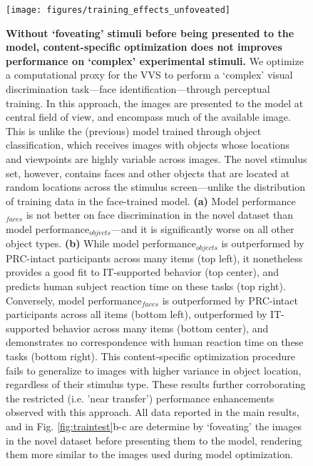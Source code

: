 \documentclass[11pt]{article}
\begin{document}
\begin{figure}[ht]
\centering
\texttt{[image: figures/training\_effects\_unfoveated]}
\renewcommand{\figurename}{Supplementary Figure}
\caption{\textbf{ Without `foveating' stimuli before being presented to the model, content-specific optimization does not improves performance on `complex' experimental stimuli.} We optimize a computational proxy for the VVS to perform a ‘complex’ visual discrimination task---face identification---through perceptual training. In this approach, the images are presented to the model at central field of view, and encompass much of the available image. This is unlike the (previous) model trained through object classification, which receives images with objects whose locations and viewpoints are highly variable across images. The novel stimulus set, however, contains faces and other objects that are located at random locations across the stimulus screen---unlike the distribution of training data in the face-trained model. \textbf{(a)} Model performance$_{faces}$ is not better on face discrimination in the novel dataset than model performance$_{objects}$---and it is significantly worse on all other object types. \textbf{(b)} While model performance$_{objects}$ is outperformed by PRC-intact participants across many items (top left), it nonetheless provides a good fit to IT-supported behavior (top center), and predicts human subject reaction time on these tasks (top right). Conversely, model performance$_{faces}$ is outperformed by PRC-intact participants across all items (bottom left), outperformed by IT-supported behavior across many items (bottom center), and demonstrates no correspondence with human reaction time on these tasks (bottom right). This content-specific optimization procedure fails to generalize to images with higher variance in object location, regardless of their stimulus type. These results further corroborating the restricted (i.e. 'near transfer') performance enhancements observed with this approach. All data reported in the main results, and in Fig. \ref{fig:traintest}b-c are determine by `foveating' the images in the novel dataset before presenting them to the model, rendering them more similar to the images used during model optimization.}
\label{fig:compare_readouts_unfoveated}
\end{figure}
\end{document}
